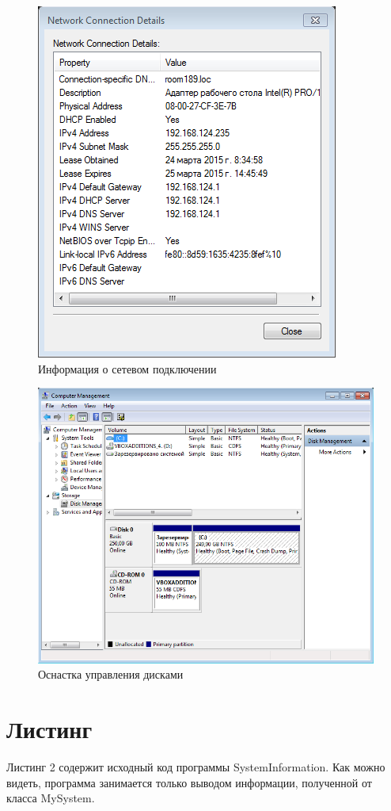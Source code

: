 \documentclass[a4paper, 12pt]{report}		%
\begin{document}
\begin{figure}[h!]
\centering
\includegraphics[scale=0.9]{res/network}
\caption{Информация о сетевом подключении}
\end{figure}

\begin{figure}[h!]
\centering
\includegraphics[scale=0.9]{res/disks}
\caption{Оснастка управления дисками}
\end{figure}

\section*{Листинг}
Листинг 2 содержит исходный код программы SystemInformation. Как можно видеть, программа занимается только выводом информации, полученной от класса MySystem.
\end{document}
